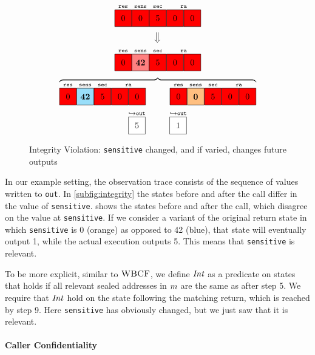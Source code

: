 \documentclass[10pt,conference]{ieeetran}%
\theoremstyle{definition}
\begin{document}
\newcommand{\figfourbox}[1][]{\genbox{20pt}{red}{#1}}

\begin{figure}
  \centering
  \[
  \stackrel{\texttt{res}}{\figfourbox[0]}
  \stackrel{\texttt{sens}}{\figfourbox[0]}
  \stackrel{\texttt{sec}}{\figfourbox[5]}
  \stackrel{\texttt{ra}}{\figfourbox[0]\figfourbox[0]}\]
  \[\big\Downarrow\]
  \[
  \stackrel{\texttt{res}}{\figfourbox[0]}
  \stackrel{\texttt{sens}}{\genbox{20pt}{red!50}{\bf 42}}
  \stackrel{\texttt{sec}}{\figfourbox[5]}
  \stackrel{\texttt{ra}}{\figfourbox[0]\figfourbox[0]}\]
  \[\overbrace{
    \stackrel{\texttt{res}}{\figfourbox[0]}
    \stackrel{\texttt{sens}}{\genbox{20pt}{\leftvariant}{\bf 42}}
    \stackrel{\texttt{sec}}{\figfourbox[5]}
    \stackrel{\texttt{ra}}{\figfourbox[0]\figfourbox[0]}
    \hspace{1cm}
    \stackrel{\texttt{res}}{\figfourbox[0]}
    \stackrel{\texttt{sens}}{\genbox{20pt}{\rightvariant}{\bf 0}}
    \stackrel{\texttt{sec}}{\figfourbox[5]}
    \stackrel{\texttt{ra}}{\figfourbox[0]\figfourbox[0]}}\]
  \[\stackrel{\hookrightarrow \mathtt{out}}{\genbox{20pt}{white}{5}} \hspace{0.5cm}
  \hspace{0.5cm}
  \stackrel{\hookrightarrow \mathtt{out}}{\genbox{20pt}{white}{1}}\]
  \caption{Integrity Violation: {\tt sensitive} changed, and if varied, changes future outputs}
  \label{fig:variant}
\end{figure}

In our example setting, the observation trace consists of the sequence
of values written to {\tt out}. In \cref{subfig:integrity} the states before
and after the call differ in the value of {\tt sensitive}. 
shows the states before and after the call, which disagree on the value at
{\tt sensitive}. If we consider a
variant of the original return state in which {\tt sensitive} is 0 (orange)
as opposed to 42 (blue), that state will eventually output 1, while the actual
execution outputs 5. This means that {\tt sensitive} is relevant.

To be more explicit, similar to \(\textnormal{\sc WBCF}\), we define
\(\mathit{Int}\) as a predicate on states that holds if
all relevant sealed addresses in \(m\) are the same as after step 5.
We require that \(\mathit{Int}\) hold on the state following the matching return,
which is reached by step 9. Here {\tt sensitive} has obviously changed, but we
just saw that it is relevant.

\paragraph*{Caller Confidentiality}
\end{document}
